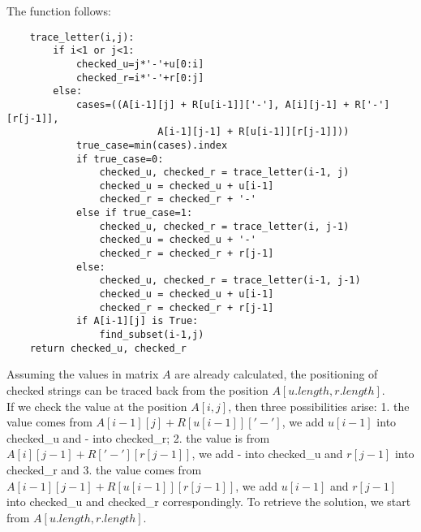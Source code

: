\documentclass[a4paper,11pt]{article}
\begin{document}
The function follows:\\

\begin{lstlisting}
    trace_letter(i,j):
        if i<1 or j<1:
            checked_u=j*'-'+u[0:i]
            checked_r=i*'-'+r[0:j]
        else: 
            cases=((A[i-1][j] + R[u[i-1]]['-'], A[i][j-1] + R['-'][r[j-1]],
                          A[i-1][j-1] + R[u[i-1]][r[j-1]]))
            true_case=min(cases).index
            if true_case=0: 
                checked_u, checked_r = trace_letter(i-1, j)
                checked_u = checked_u + u[i-1]
                checked_r = checked_r + '-'
            else if true_case=1: 
                checked_u, checked_r = trace_letter(i, j-1)
                checked_u = checked_u + '-'
                checked_r = checked_r + r[j-1]
            else: 
                checked_u, checked_r = trace_letter(i-1, j-1)
                checked_u = checked_u + u[i-1]
                checked_r = checked_r + r[j-1]
            if A[i-1][j] is True:
                find_subset(i-1,j)
    return checked_u, checked_r
\end{lstlisting}

Assuming the values in matrix $A$ are already calculated, the positioning of checked strings can be traced back from the position $A[u.length,r.length]$.\\

If we check the value at the position $A[i,j]$, then three possibilities arise: 1. the value comes from $A[i-1][j] + R[u[i-1]]['-']$, we add $u[i-1]$ into checked\_u and $\mbox{-}$ into checked\_r; 2. the value is from $A[i][j-1] + R['-'][r[j-1]]$, we add $\mbox{-}$ into checked\_u and $r[j-1]$ into checked\_r and 3. the value comes from $A[i-1][j-1] + R[u[i-1]][r[j-1]]$, we add $u[i-1]$ and $r[j-1]$ into checked\_u and checked\_r correspondingly. To retrieve the solution, we start from $A[u.length,r.length]$. \\
\end{document}
